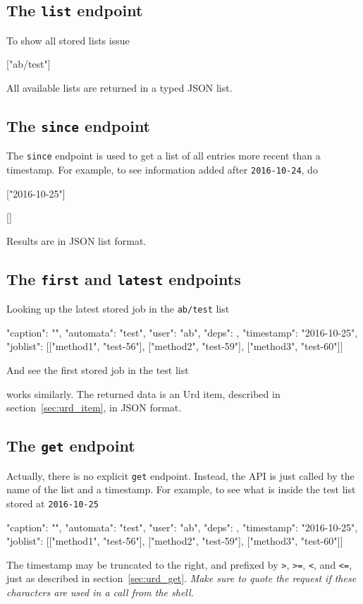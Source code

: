 \subsection{The \texttt{list} endpoint}
To show all stored lists issue
\begin{shell}
["ab/test"]
\end{shell}
All available lists are returned in a typed JSON list.


\subsection{The \texttt{since} endpoint}
The \texttt{since} endpoint is used to get a list of all entries more
recent than a timestamp.  For example, to see information added
after \texttt{2016-10-24}, do
\begin{shell}
["2016-10-25"]
\end{shell}
\begin{shell}
[]
\end{shell}
Results are in JSON list format.


\subsection{The \texttt{first} and \texttt{latest} endpoints}
Looking up the latest stored job in the \texttt{ab/test} list
\begin{shell}
{"caption": "", "automata": "test", "user": "ab", "deps": {},
  "timestamp": "2016-10-25", "joblist": [["method1", "test-56"],
  ["method2", "test-59"], ["method3", "test-60"]]}
\end{shell}
And see the first stored job in the test list
\begin{shell}
\end{shell}
works similarly.  The returned data is an Urd item, described in
section~\ref{sec:urd_item}, in JSON format.


\subsection{The \texttt{get} endpoint}
Actually, there is no explicit \texttt{get} endpoint.  Instead, the
API is just called by the name of the list and a timestamp.  For
example, to see what is inside the test list stored
at \texttt{2016-10-25}
\begin{shell}
{"caption": "", "automata": "test", "user": "ab", "deps": {},
  "timestamp": "2016-10-25", "joblist": [["method1", "test-56"],
  ["method2", "test-59"], ["method3", "test-60"]]}
\end{shell}
The timestamp may be truncated to the right, and prefixed
by \texttt{>}, \texttt{>=}, \texttt{<}, and \texttt{<=}, just as
described in section~\ref{sec:urd_get}.  \textsl{Make sure to quote
the request if these characters are used in a call from the shell.}



